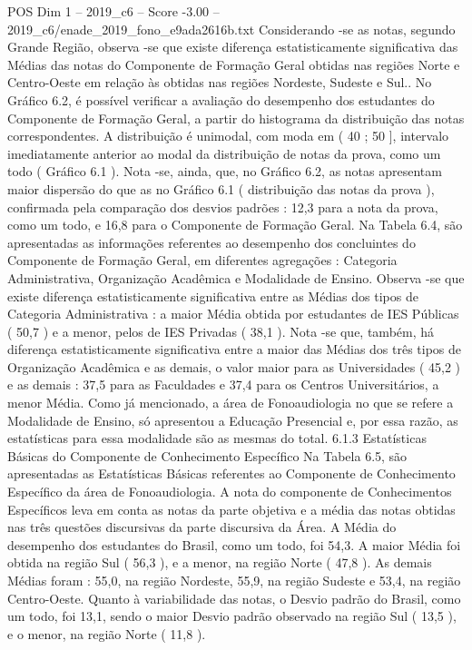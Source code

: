 \begin{textsample}{POS Dim 1 – 2019\_c6 – Score -3.00 – 2019\_c6/enade\_2019\_fono\_e9ada2616b.txt}
Considerando -se as notas, segundo Grande Região, observa -se que existe diferença estatisticamente significativa das Médias das notas do Componente de Formação Geral obtidas nas regiões Norte e Centro-Oeste em relação às obtidas nas regiões Nordeste, Sudeste e Sul..
No Gráfico 6.2, é possível verificar a avaliação do desempenho dos estudantes do Componente de Formação Geral, a partir do histograma da distribuição das notas correspondentes.
A distribuição é unimodal, com moda em ( 40 ; 50 ], intervalo imediatamente anterior ao modal da distribuição de notas da prova, como um todo ( Gráfico 6.1 ).
Nota -se, ainda, que, no Gráfico 6.2, as notas apresentam maior dispersão do que as no Gráfico 6.1 ( distribuição das notas da prova ), confirmada pela comparação dos desvios padrões : 12,3 para a nota da prova, como um todo, e 16,8 para o Componente de Formação Geral.
Na Tabela 6.4, são apresentadas as informações referentes ao desempenho dos concluintes do Componente de Formação Geral, em diferentes agregações : Categoria Administrativa, Organização Acadêmica e Modalidade de Ensino.
Observa -se que existe diferença estatisticamente significativa entre as Médias dos tipos de Categoria Administrativa : a maior Média obtida por estudantes de IES Públicas ( 50,7 ) e a menor, pelos de IES Privadas ( 38,1 ).
Nota -se que, também, há diferença estatisticamente significativa entre a maior das Médias dos três tipos de Organização Acadêmica e as demais, o valor maior para as Universidades ( 45,2 ) e as demais : 37,5 para as Faculdades e 37,4 para os Centros Universitários, a menor Média.
Como já mencionado, a área de Fonoaudiologia no que se refere a Modalidade de Ensino, só apresentou a Educação Presencial e, por essa razão, as estatísticas para essa modalidade são as mesmas do total. 6.1.3 Estatísticas Básicas do Componente de Conhecimento Específico Na Tabela 6.5, são apresentadas as Estatísticas Básicas referentes ao Componente de Conhecimento Específico da área de Fonoaudiologia.
A nota do componente de Conhecimentos Específicos leva em conta as notas da parte objetiva e a média das notas obtidas nas três questões discursivas da parte discursiva da Área.
A Média do desempenho dos estudantes do Brasil, como um todo, foi 54,3.
A maior Média foi obtida na região Sul ( 56,3 ), e a menor, na região Norte ( 47,8 ).
As demais Médias foram : 55,0, na região Nordeste, 55,9, na região Sudeste e 53,4, na região Centro-Oeste.
Quanto à variabilidade das notas, o Desvio padrão do Brasil, como um todo, foi 13,1, sendo o maior Desvio padrão observado na região Sul ( 13,5 ), e o menor, na região Norte ( 11,8 ).

\end{textsample}
